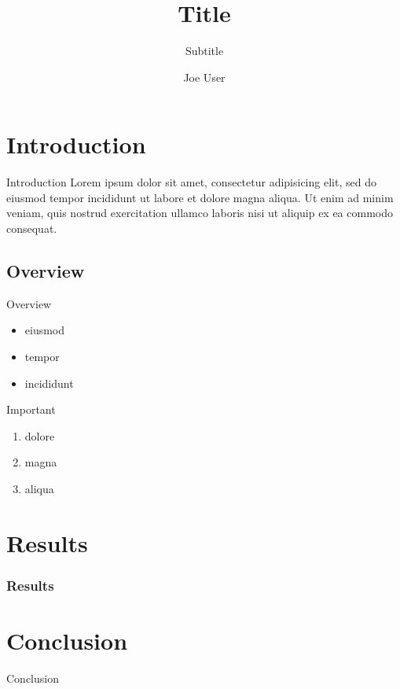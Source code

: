 \documentclass{beamer}
\institute{Universität Bielefeld}
\title{Title}
\subtitle{Subtitle}
\author{Joe User}
\begin{document}
\begin{frame}
\titlepage
\end{frame}

\section{Introduction}

\begin{frame}{Introduction}
  Lorem ipsum dolor sit amet, consectetur adipisicing elit, sed
  do eiusmod tempor incididunt ut labore et dolore magna aliqua.
  Ut enim ad minim veniam, quis nostrud exercitation ullamco
  laboris nisi ut aliquip ex ea commodo consequat.
\end{frame}

  \subsection{Overview}

  \begin{frame}{Overview}
    \begin{itemize}
      \item eiusmod
      \item tempor
      \item incididunt
    \end{itemize}
    \begin{block}{Important}
      \begin{enumerate}
        \item dolore
        \item magna
        \item aliqua
      \end{enumerate}
    \end{block}
  \end{frame}

\section{Results}

\begin{frame}
  \frametitle{Results}
\end{frame}

\section{Conclusion}

\begin{frame}{Conclusion}
\end{frame}
\end{document}
